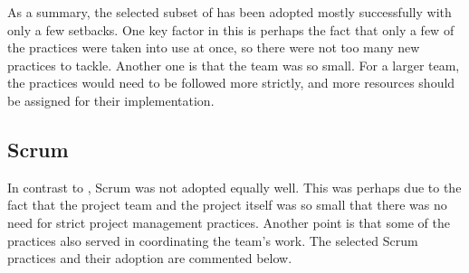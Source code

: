 As a summary, the selected subset of  has been adopted 
mostly successfully with only a few setbacks. One key factor in this 
is perhaps the fact that only a few of the practices were taken into 
use at once, so there were not too many new practices to tackle. 
Another one is that the team was so small. For a larger team, the 
practices would need to be followed more strictly, and more resources 
should be assigned for their implementation.


\subsection{Scrum}
\label{toc:result:agile:scrum}

In contrast to , Scrum was not adopted equally well. This 
was perhaps due to the fact that the project team and the project 
itself was so small that there was no need for strict project 
management practices. Another point is that some of the  
practices also served in coordinating the team's work. The selected 
Scrum practices and their adoption are commented below.


